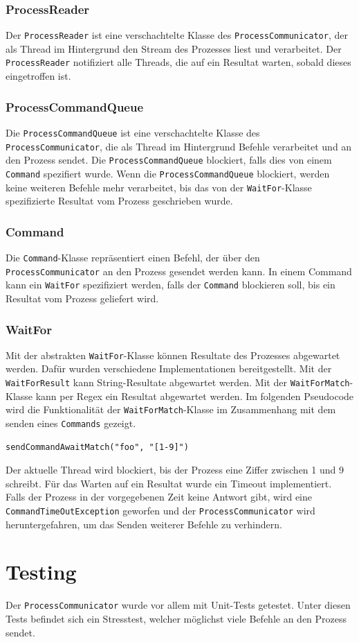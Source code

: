 \subsubsection{ProcessReader}

Der \verb!ProcessReader! ist eine verschachtelte Klasse des \verb!ProcessCommunicator!, der als Thread im Hintergrund den Stream des Prozesses liest und verarbeitet. Der \verb!ProcessReader! notifiziert alle Threads, die auf ein Resultat warten, sobald dieses eingetroffen ist.

\subsubsection{ProcessCommandQueue}

Die \verb!ProcessCommandQueue! ist eine verschachtelte Klasse des \verb!ProcessCommunicator!, die als Thread im Hintergrund Befehle verarbeitet und an den Prozess sendet. Die \verb!ProcessCommandQueue! blockiert, falls dies von einem \verb!Command! spezifiert wurde. Wenn die \verb!ProcessCommandQueue! blockiert, werden keine weiteren Befehle mehr verarbeitet, bis das von der \verb!WaitFor!-Klasse spezifizierte Resultat vom Prozess geschrieben wurde.

\subsubsection{Command}

Die \verb!Command!-Klasse repräsentiert einen Befehl, der über den \verb!ProcessCommunicator! an den Prozess gesendet werden kann. In einem Command kann ein \verb!WaitFor! spezifiziert werden, falls der \verb!Command! blockieren soll, bis ein Resultat vom Prozess geliefert wird.

\newpage
\subsubsection{WaitFor}

Mit der abstrakten \verb!WaitFor!-Klasse können Resultate des Prozesses abgewartet werden. Dafür wurden verschiedene Implementationen bereitgestellt. Mit der \verb!WaitForResult! kann String-Resultate abgewartet werden. Mit der \verb!WaitForMatch!-Klasse kann per Regex ein Resultat abgewartet werden. Im folgenden Pseudocode wird die Funktionalität der \verb!WaitForMatch!-Klasse im Zusammenhang mit dem senden eines \verb!Commands! gezeigt.
%
\begin{verbatim}
sendCommandAwaitMatch("foo", "[1-9]")
\end{verbatim}
%
Der aktuelle Thread wird blockiert, bis der Prozess eine Ziffer zwischen 1 und 9 schreibt. Für das Warten auf ein Resultat wurde ein Timeout implementiert. Falls der Prozess in der vorgegebenen Zeit keine Antwort gibt, wird eine \\ \verb!CommandTimeOutException! geworfen und der \verb!ProcessCommunicator! wird heruntergefahren, um das Senden weiterer Befehle zu verhindern.

\section{Testing}
Der \verb!ProcessCommunicator! wurde vor allem mit Unit-Tests getestet. Unter diesen Tests befindet sich ein Stresstest, welcher möglichst viele Befehle an den Prozess sendet.


